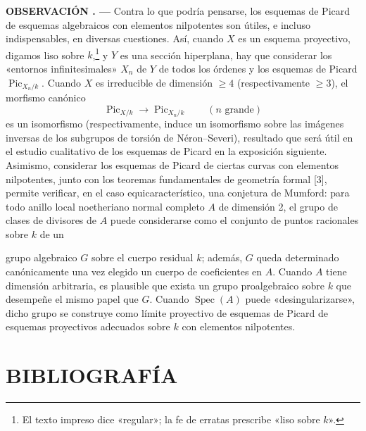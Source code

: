\documentclass[11pt,twoside,openany]{book}
\numberwithin{equation}{section}
\newcommand{\src}[1]{%
  \phantomsection\hypertarget{src:#1}{}%
  \marginpar{\raggedleft\footnotesize\sffamily #1}%
}
\theoremstyle{plain}
\theoremstyle{definition}
\theoremstyle{remark}
\newcommand{\result}[2]{%
  \par\medskip\noindent\textbf{#1%
  \if\relax\detokenize{#2}\relax\else\space#2\fi. ---}\enspace
}
\newcommand{\FgaUnitKey}{frontmatter}
\renewcommand{\src}[1]{%
  \phantomsection\hypertarget{src:\FgaUnitKey:#1}{}%
  \marginpar{\raggedleft\footnotesize\sffamily #1}%
}
\theoremstyle{plain}
\theoremstyle{definition}
\theoremstyle{remark}
\begin{document}
\result{OBSERVACIÓN}{6.8} Contra lo que podría pensarse, los esquemas de Picard
de esquemas algebraicos con elementos nilpotentes son útiles, e incluso
indispensables, en diversas cuestiones. Así, cuando $X$ es un esquema
proyectivo, digamos liso sobre $k$,\footnote{El texto impreso dice «regular»; la
fe de erratas prescribe «liso sobre $k$».} y $Y$ es una sección hiperplana, hay que
considerar los «entornos infinitesimales» $X_n$ de $Y$ de todos los órdenes y
los esquemas de Picard $\operatorname{Pic}_{X_n/k}$. Cuando $X$ es irreducible
de dimensión $\geq4$ (respectivamente $\geq3$), el morfismo canónico
\[
\operatorname{Pic}_{X/k}\longrightarrow\operatorname{Pic}_{X_n/k}
\qquad(n\text{ grande})
\]
es un isomorfismo (respectivamente, induce un isomorfismo sobre las imágenes
inversas de los subgrupos de torsión de Néron--Severi), resultado que será útil
en el estudio cualitativo de los esquemas de Picard en la exposición siguiente.
Asimismo, considerar los esquemas de Picard de ciertas curvas con elementos
nilpotentes, junto con los teoremas fundamentales de geometría formal [3],
permite verificar, en el caso equicaracterístico, una conjetura de Mumford:
para todo anillo local noetheriano normal completo $A$ de dimensión 2, el grupo
de clases de divisores de $A$ puede considerarse como el conjunto de puntos
racionales sobre $k$ de un

\src{161}
grupo algebraico $G$ sobre el cuerpo residual $k$; además, $G$ queda
determinado canónicamente una vez elegido un cuerpo de coeficientes en $A$.
Cuando $A$ tiene dimensión arbitraria, es plausible que exista un grupo
proalgebraico sobre $k$ que desempeñe el mismo papel que $G$. Cuando
$\operatorname{Spec}(A)$ puede «desingularizarse», dicho grupo se construye como
límite proyectivo de esquemas de Picard de esquemas proyectivos adecuados sobre
$k$ con elementos nilpotentes.

\section*{BIBLIOGRAFÍA}
\end{document}
